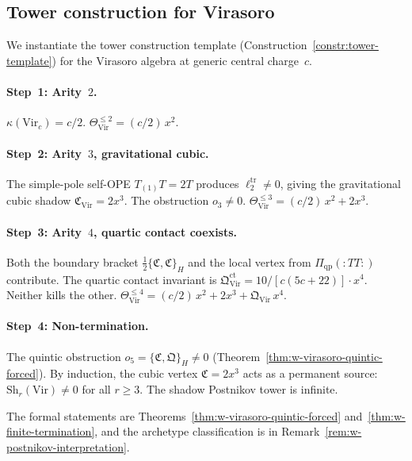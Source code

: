 \subsection{Tower construction for Virasoro}
\label{subsec:virasoro-tower-construction}

We instantiate the tower construction template
(Construction~\ref{constr:tower-template}) for the Virasoro
algebra at generic central charge~$c$.

\paragraph{Step~1: Arity~$2$.}
$\kappa(\mathrm{Vir}_c) = c/2$.
$\Theta_{\mathrm{Vir}}^{\leq 2} = (c/2)\,x^2$.

\paragraph{Step~2: Arity~$3$, gravitational cubic.}
The simple-pole self-OPE $T_{(1)}T = 2T$ produces
$\ell_2^{\mathrm{tr}} \neq 0$, giving the gravitational cubic
shadow $\mathfrak{C}_{\mathrm{Vir}} = 2x^3$.
The obstruction $o_3 \neq 0$.
$\Theta_{\mathrm{Vir}}^{\leq 3} = (c/2)\,x^2 + 2x^3$.

\paragraph{Step~3: Arity~$4$, quartic contact coexists.}
Both the boundary bracket
$\tfrac12\{\mathfrak{C},\mathfrak{C}\}_H$ and the local vertex
from $\Pi_{\mathrm{qp}}(:TT:)$ contribute.  The quartic contact
invariant is $\mathfrak{Q}_{\mathrm{Vir}}^{\mathrm{ct}}
= 10/[c(5c{+}22)]\cdot x^4$.
Neither kills the other.
$\Theta_{\mathrm{Vir}}^{\leq 4}
= (c/2)\,x^2 + 2x^3 + \mathfrak{Q}_{\mathrm{Vir}}\,x^4$.

\paragraph{Step~4: Non-termination.}
The quintic obstruction
$o_5 = \{\mathfrak{C},\mathfrak{Q}\}_H \neq 0$
(Theorem~\ref{thm:w-virasoro-quintic-forced}).
By induction, the cubic vertex $\mathfrak{C} = 2x^3$ acts as a
permanent source: $\mathrm{Sh}_r(\mathrm{Vir}) \neq 0$ for all
$r \geq 3$.  The shadow Postnikov tower is infinite.

\medskip
The formal statements are
Theorems~\ref{thm:w-virasoro-quintic-forced}
and~\ref{thm:w-finite-termination}, and the archetype
classification is in Remark~\ref{rem:w-postnikov-interpretation}.

